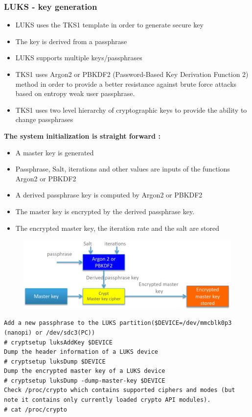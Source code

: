 \documentclass[resume]{subfiles}
\begin{document}
\subsubsection{LUKS - key generation}
\begin{itemize}
\item LUKS uses the TKS1 template in order to generate secure key
\item The key is derived from a passphrase
\item LUKS supports multiple keys/passphrases
\item TKS1 uses Argon2 or PBKDF2 (Password-Based Key Derivation Function 2) method in order to provide a better resistance against brute force attacks based on entropy weak user passphrase.
\item TKS1 uses two level hierarchy of cryptographic keys to provide the ability to change passphrases
\end{itemize}

\textbf{The system initialization is straight forward :}
\begin{itemize}
\item A master key is generated
\item Passphrase, Salt, iterations and other values are inputs of the functions Argon2 or PBKDF2
\item A derived passphrase key is computed by Argon2 or PBKDF2
\item The master key is encrypted by the derived passphrase key.
\item The encrypted master key, the iteration rate and the salt are stored
\end{itemize}

\begin{figure}[H]
    \centering
    \includegraphics[width=0.75\columnwidth]{Figures/fileSystem/luksKeyGen.png}
    \label{fig:luksKeyGen}
\end{figure}

\begin{lstlisting}[style=console,label={},caption={}]
Add a new passphrase to the LUKS partition($DEVICE=/dev/mmcblk0p3 (nanopi) or /dev/sdc3(PC))
# cryptsetup luksAddKey $DEVICE
Dump the header information of a LUKS device
# cryptsetup luksDump $DEVICE
Dump the encrypted master key of a LUKS device
# cryptsetup luksDump -dump-master-key $DEVICE
Check /proc/crypto which contains supported ciphers and modes (but note it contains only currently loaded crypto API modules).
# cat /proc/crypto
\end{lstlisting}
\end{document}
